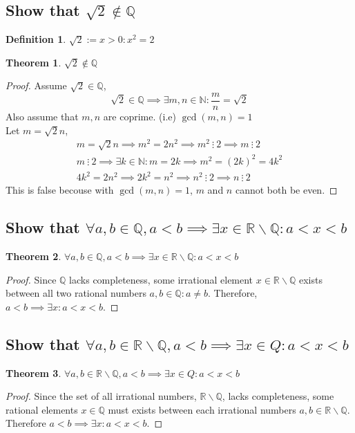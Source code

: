 \documentclass[]{article}
\newcommand{\R}{\mathbb{R}}
\newcommand{\N}{\mathbb{N}}
\newcommand{\Q}{\mathbb{Q}}
\newcommand{\divisible}{ \ \vdots \ }
\newtheorem{definition}{Definition}
\newtheorem{theorem}{Theorem}
\begin{document}
\subsection{Show that $\sqrt{2} \notin \Q$}
\begin{definition}
    $\sqrt{2} := x > 0 : x^2 = 2$
\end{definition}
\begin{theorem}
    $\sqrt{2} \notin \Q$
\end{theorem}
\begin{proof}
    Assume $\sqrt{2} \in \Q$,
    $$\sqrt{2} \in \Q \implies \exists m,n \in \N : \frac{m}{n} = \sqrt{2}$$
    Also assume that $m,n$ are coprime. (i.e) $\gcd(m,n)=1$\\
    Let $m = \sqrt{2} n$,
    \begin{align*}
        m = \sqrt{2} n \implies m^2 = 2 n^2 \implies m^2 \divisible 2 \implies m \divisible 2\\
        m \divisible 2 \implies \exists k \in \N : m = 2k \implies m^2 = (2k)^2 = 4 k^2\\
        4k^2 = 2 n^2 \implies 2k^2 = n^2 \implies n^2 \divisible 2 \implies n \divisible 2
    \end{align*}
    This is false becouse with $\gcd(m,n)=1$, $m$ and $n$ cannot both be even.
\end{proof}

\subsection{Show that 
    $\forall a,b \in \Q, a < b \implies \exists x \in \R \backslash \Q : a < x < b$
}
\begin{theorem}
    $\forall a,b \in \Q, a < b \implies \exists x \in \R \backslash \Q : a < x < b$
\end{theorem}
\begin{proof}
    Since $\Q$ lacks completeness, some irrational element $x \in \R \backslash \Q$ 
    exists between all two rational numbers $a,b\in \Q : a \neq b$. 
    Therefore, $a < b \implies \exists x : a < x < b$.
\end{proof}

\subsection{Show that
    $\forall a,b \in \R \backslash \Q, a < b \implies \exists x \in Q : a < x < b$
}
\begin{theorem}
    $\forall a,b \in \R \backslash \Q, a < b \implies \exists x \in Q : a < x < b$
\end{theorem}
\begin{proof}
    Since the set of all irrational numbers, $\R \backslash \Q$, lacks completeness, 
    some rational elements $x \in \Q$ must exists between each irrational numbers 
    $a,b \in \R \backslash \Q$. Therefore $a < b \implies \exists x : a < x < b$.
\end{proof}
\end{document}
